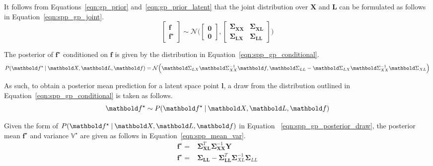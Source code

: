 It follows from Equations~\ref{eqn:gp_prior} and~\ref{eqn:gp_prior_latent} that 
the joint distribution over \( \bm{X} \) and \( \bm{L} \) can be formulated as 
follows in Equation~\ref{eqn:spp_gp_joint}.
\begin{equation}
  \label{eqn:spp_gp_joint}
  \begin{bmatrix}
    \bm{f}\\
    \bm{f}^{\star}
  \end{bmatrix}
  \sim \mathcal{N} \Bigg(
    \begin{bmatrix}
      \bm{0}\\
      \bm{0}
    \end{bmatrix},
    \begin{bmatrix}
      \bm{\Sigma}_{\bm{XX}} & \bm{\Sigma}_{\bm{XL}}\\
      \bm{\Sigma}_{\bm{LX}} & \bm{\Sigma}_{\bm{LL}}
    \end{bmatrix}
  \Bigg)
\end{equation}

The posterior of \( \bm{f}^{\star} \) conditioned on \( \bm{f} \) is given by
the distribution in Equation~\ref{eqn:spp_gp_conditional}.
\begin{equation}
  \label{eqn:spp_gp_conditional}
  P(\bm{f}^{\star} \given \bm{X}, \bm{L}, \bm{f}) = 
  \mathcal{N} \Big(
    \bm{\Sigma}_{LX} \bm{\Sigma}_{XX}^{-1} \bm{f}, 
    \bm{\Sigma}_{LL} - \bm{\Sigma}_{LX} \bm{\Sigma}_{XX}^{-1} \bm{\Sigma}_{XL}
  \Big) 
\end{equation}

As such, to obtain a posterior mean prediction for a latent space point \( \bm{l} \), 
a draw from the distribution outlined in Equation~\ref{eqn:spp_gp_conditional} is 
taken as follows.
\begin{equation}
  \label{eqn:spp_gp_posterior_draw}
  \bm{f}^{\star} \sim P(\bm{f}^{\star} \given \bm{X}, \bm{L}, \bm{f})
\end{equation}

Given the form of \( P(\bm{f}^{\star} \given \bm{X}, \bm{L}, \bm{f}) \) in Equation
~\ref{eqn:spp_gp_posterior_draw}, the posterior mean \( \bm{f}^{\star} \) and variance
\( \mathbb{V}^{\star} \) are given as follows in Equation~\ref{eqn:spp_mean_var}.
\begin{align}
  \label{eqn:spp_mean_var}
  \bm{f}^{\star} ={}& 
  \bm{\Sigma}_{\bm{XL}}^{T} \bm{\Sigma}_{\bm{XX}}^{-1} \bm{Y}\\
  \mathbb{\bm{f}^{\star}} ={}&
  \bm{\Sigma}_{\bm{LL}} - \bm{\Sigma}_{\bm{LL}}^{T} \bm{\Sigma}_{XL}^{-1} \bm{\Sigma}_{LL}
\end{align}

